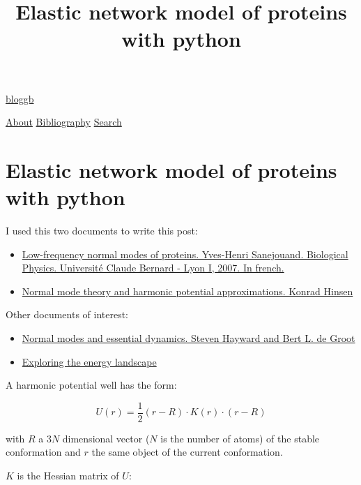 \documentclass[
]{article}
\title{Elastic network model of proteins with python}
\author{}
\date{}
\providecommand{\tightlist}{%
  \setlength{\itemsep}{0pt}\setlength{\parskip}{0pt}}
\begin{document}
\maketitle

\href{/}{bloggb}

\protect\hyperlink{}{}

\href{/about/}{About} \href{/bibliography.html}{Bibliography}
\href{/search.html}{Search}

\hypertarget{elastic-network-model-of-proteins-with-python}{%
\section{Elastic network model of proteins with
python}\label{elastic-network-model-of-proteins-with-python}}

I used this two documents to write this post:

\begin{itemize}
\tightlist
\item
  \href{https://tel.archives-ouvertes.fr/file/index/docid/258781/filename/hdr2007.pdf}{Low-frequency
  normal modes of proteins. Yves-Henri Sanejouand. Biological Physics.
  Université Claude Bernard - Lyon I, 2007. In french.}
\item
  \href{http://www.pasteur.fr/recherche/unites/Binfs/EMBO2004/coursenotes/hinsen_normal_modes.pdf}{Normal
  mode theory and harmonic potential approximations. Konrad Hinsen}
\end{itemize}

Other documents of interest:

\begin{itemize}
\item
  \href{http://www3.mpibpc.mpg.de/groups/de_groot/pdf/Hayward_deGroot_nm_ed.pdf}{Normal
  modes and essential dynamics. Steven Hayward and Bert L. de Groot}
\item
  \href{http://www.engr.ucsb.edu/~shell/che210d/Exploring_the_energy_landscape.pdf}{Exploring
  the energy landscape}
\end{itemize}

A harmonic potential well has the form:

\[U(r) = \frac{1}{2}(r-R) \cdot K(r) \cdot (r-R)\]

with \(R\) a \(3N\) dimensional vector (\(N\) is the number of atoms) of
the stable conformation and \(r\) the same object of the current
conformation.

\(K\) is the Hessian matrix of \(U\):
\end{document}
